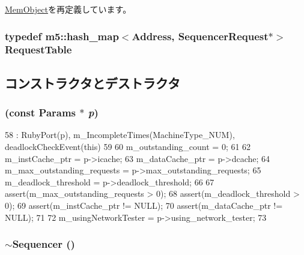 \hyperlink{classMemObject_a905bbc621eeec0ed08859e21c8c95412}{MemObject}を再定義しています。\hypertarget{classSequencer_ab8b07c7968ec41f243eeb0c53e459bb8}{
\subsubsection[{RequestTable}]{\setlength{\rightskip}{0pt plus 5cm}typedef m5::hash\_\-map$<${\bf Address}, {\bf SequencerRequest}$\ast$$>$ {\bf RequestTable}}}
\label{classSequencer_ab8b07c7968ec41f243eeb0c53e459bb8}


\subsection{コンストラクタとデストラクタ}
\hypertarget{classSequencer_a5f15f2d0a36488220062dc04ca597b6e}{
\subsubsection[{Sequencer}]{ (const {\bf Params} $\ast$ {\em p})}}
\label{classSequencer_a5f15f2d0a36488220062dc04ca597b6e}



\begin{DoxyCode}
58     : RubyPort(p), m_IncompleteTimes(MachineType_NUM), deadlockCheckEvent(this)
59 {
60     m_outstanding_count = 0;
61 
62     m_instCache_ptr = p->icache;
63     m_dataCache_ptr = p->dcache;
64     m_max_outstanding_requests = p->max_outstanding_requests;
65     m_deadlock_threshold = p->deadlock_threshold;
66 
67     assert(m_max_outstanding_requests > 0);
68     assert(m_deadlock_threshold > 0);
69     assert(m_instCache_ptr != NULL);
70     assert(m_dataCache_ptr != NULL);
71 
72     m_usingNetworkTester = p->using_network_tester;
73 }
\end{DoxyCode}
\hypertarget{classSequencer_a33e9de4a3e9618f014e48385c51abe67}{
\subsubsection[{$\sim$Sequencer}]{\setlength{\rightskip}{0pt plus 5cm}$\sim${\bf Sequencer} ()}}
\label{classSequencer_a33e9de4a3e9618f014e48385c51abe67}



